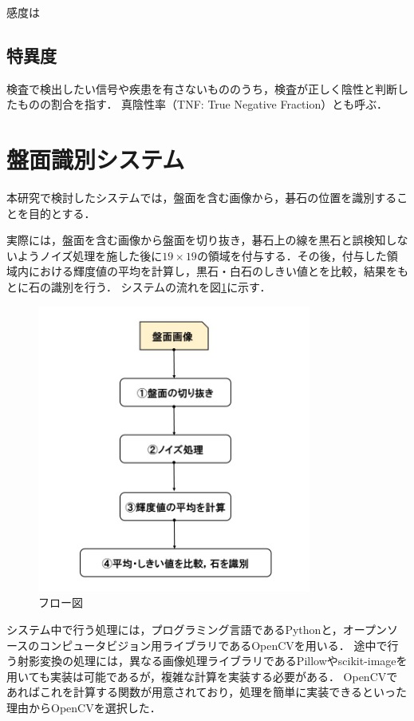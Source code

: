 \documentclass[openright]{nitocs}
\numberwithin{equation}{section}
\begin{document}
        感度は

        \subsection{特異度} %
        検査で検出したい信号や疾患を有さないもののうち，検査が正しく陰性と判断したものの割合を指す．
        真陰性率（TNF: True Negative Fraction）とも呼ぶ．

    \section{盤面識別システム} %
    \label{system}
        本研究で検討したシステムでは，盤面を含む画像から，碁石の位置を識別することを目的とする．

        実際には，盤面を含む画像から盤面を切り抜き，碁石上の線を黒石と誤検知しないようノイズ処理を施した後に$19\times19$の領域を付与する．その後，付与した領域内における輝度値の平均を計算し，黒石・白石のしきい値とを比較，結果をもとに石の識別を行う．
        システムの流れを図\ref{flow}に示す．
        \begin{figure}[tb] %
            \begin{center}
            \includegraphics[clip,width=90mm]{flow.jpg} 
            \caption{フロー図}
            \label{flow}
            \end{center}
        \end{figure}

        システム中で行う処理には，プログラミング言語であるPythonと，オープンソースのコンピュータビジョン用ライブラリであるOpenCVを用いる．
        途中で行う射影変換の処理には，異なる画像処理ライブラリであるPillowやscikit-imageを用いても実装は可能であるが，複雑な計算を実装する必要がある．
        OpenCVであればこれを計算する関数が用意されており，処理を簡単に実装できるといった理由からOpenCVを選択した．
\end{document}

